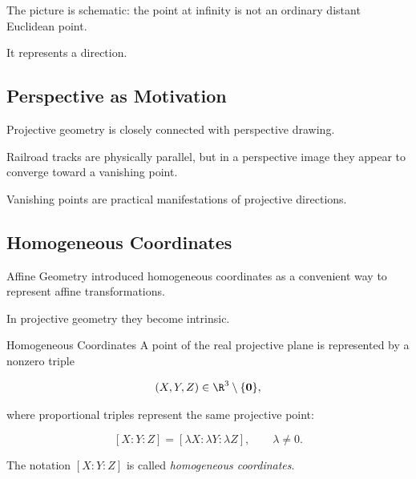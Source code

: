 The picture is schematic: the point at infinity is not an ordinary distant
Euclidean point.

It represents a direction.

\subsection{Perspective as Motivation}
\label{subsec:projective-perspective-motivation}

Projective geometry is closely connected with perspective drawing.

Railroad tracks are physically parallel, but in a perspective image they
appear to converge toward a vanishing point.

\begin{centereddiagram}
\end{centereddiagram}

Vanishing points are practical manifestations of projective directions.

\subsection{Homogeneous Coordinates}
\label{subsec:projective-homogeneous-coordinates}

Affine Geometry introduced homogeneous coordinates as a convenient way to
represent affine transformations.

In projective geometry they become intrinsic.

\begin{definitionbox}{Homogeneous Coordinates}
A point of the real projective plane is represented by a nonzero triple

\[
(X,Y,Z)\in\R^3\setminus\{\mathbf{0}\},
\]

where proportional triples represent the same projective point:

\[
\boxed{
[X:Y:Z]=[\lambda X:\lambda Y:\lambda Z],
\qquad
\lambda\neq0.
}
\]

The notation \([X:Y:Z]\) is called \emph{homogeneous coordinates}.
\end{definitionbox}

